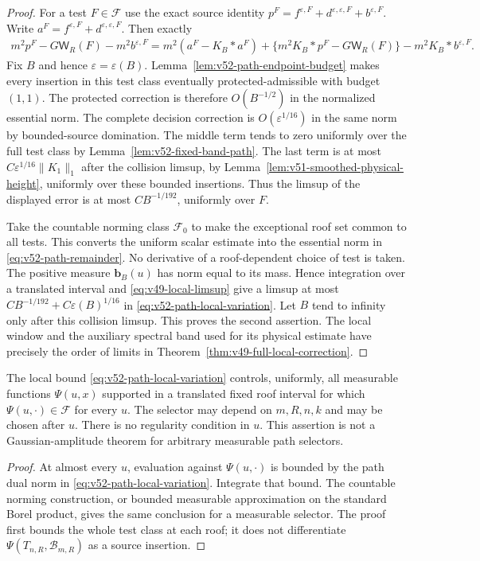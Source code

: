 \begin{proof}
For a test $F\in\mathcal F$ use the exact source identity
$p^F=f^{\varepsilon,F}+d^{\varepsilon,\varepsilon,F}
+b^{\varepsilon,F}$. Write $a^F=f^{\varepsilon,F}
+d^{\varepsilon,\varepsilon,F}$. Then exactly
\begin{align*}
 m^2p^F-G\mathsf W_R(F)-m^2b^{\varepsilon,F}
  =m^2(a^F-K_B*a^F)
   +\{m^2K_B*p^F-G\mathsf W_R(F)\}
   -m^2K_B*b^{\varepsilon,F}.
\end{align*}
Fix $B$ and hence $\varepsilon=\varepsilon(B)$.
Lemma~\ref{lem:v52-path-endpoint-budget} makes every insertion in
this test class eventually protected-admissible with budget $(1,1)$.
The protected correction is therefore $O(B^{-1/2})$ in the normalized
essential norm. The complete decision correction is
$O(\varepsilon^{1/16})$ in the same norm by bounded-source domination.
The middle term tends to zero uniformly over the full test class by
Lemma~\ref{lem:v52-fixed-band-path}. The last term is at most
$C\varepsilon^{1/16}\|K_1\|_1$ after the collision limsup, by
Lemma~\ref{lem:v51-smoothed-physical-height}, uniformly over these
bounded insertions. Thus the limsup of the displayed error is at most
$CB^{-1/192}$, uniformly over $F$.

Take the countable norming class $\mathcal F_0$ to make the exceptional
roof set common to all tests. This converts the uniform scalar
estimate into the essential norm in \eqref{eq:v52-path-remainder}.
No derivative of a roof-dependent choice of test is taken.
The positive measure $\mathbf b_B(u)$ has norm equal to its mass.
Hence integration over a translated interval and
\eqref{eq:v49-local-limsup} give a limsup at most
$CB^{-1/192}+C\varepsilon(B)^{1/16}$ in
\eqref{eq:v52-path-local-variation}. Let $B$ tend to infinity only
after this collision limsup. This proves the second assertion.
The local window and the auxiliary spectral band used for its
physical estimate have precisely the order of limits in
Theorem~\ref{thm:v49-full-local-correction}.
\end{proof}

\begin{corollary}
\label{cor:v52-roof-path-selectors}
The local bound \eqref{eq:v52-path-local-variation} controls, uniformly,
all measurable functions $\Psi(u,x)$ supported in a translated fixed
roof interval for which $\Psi(u,\cdot)\in\mathcal F$ for every $u$.
The selector may depend on $m,R,n,k$ and may be chosen after $u$.
There is no regularity condition in $u$. This assertion is not a
Gaussian-amplitude theorem for arbitrary measurable path selectors.
\end{corollary}
\begin{proof}
At almost every $u$, evaluation against $\Psi(u,\cdot)$ is bounded
by the path dual norm in \eqref{eq:v52-path-local-variation}.
Integrate that bound. The countable norming construction, or bounded
measurable approximation on the standard Borel product, gives the
same conclusion for a measurable selector. The proof first bounds
the whole test class at each roof; it does not differentiate
$\Psi(T_{n,R},\mathcal B_{m,R})$ as a source insertion.
\end{proof}
